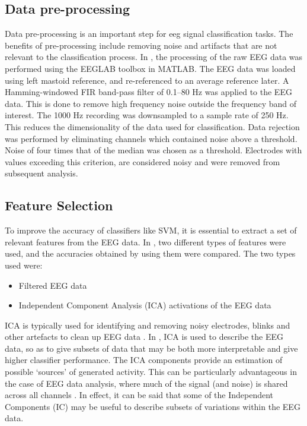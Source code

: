 \documentclass{article} %
\begin{document}
\subsection{Data pre-processing}
Data pre-processing is an important step for eeg signal classification tasks. The benefits of pre-processing include removing noise and artifacts that are not relevant to the classification process. In \cite{Stewart20141}, the processing of the raw EEG data was performed using the EEGLAB toolbox \cite{eeglab} in MATLAB. The EEG data was loaded using left mastoid reference, and re-referenced to an average reference later. A Hamming-windowed FIR band-pass filter of 0.1–80 Hz was applied to the EEG data. This is done to remove high frequency noise outside the frequency band of interest. The 1000 Hz recording was downsampled to a sample rate of 250 Hz. This reduces the dimensionality of the data used for classification.
Data rejection was performed by eliminating channels which contained noise above a threshold. Noise of four times that of the median was chosen as a threshold. Electrodes with values exceeding this criterion, are considered noisy and were removed from subsequent analysis.

\subsection{Feature Selection}
To improve the accuracy of classifiers like SVM, it is essential to extract a set of relevant features from the EEG data. In \cite{Stewart20141}, two different types of features were used, and the accuracies obtained by using them were compared. The two types used were:

\begin{itemize}
	\item Filtered EEG data
	\item Independent Component Analysis (ICA) activations of the EEG data
\end{itemize}

ICA is typically used for identifying and removing noisy electrodes, blinks and other artefacts to clean up EEG data \cite{luck2005}. In \cite{Stewart20141}, ICA is used to describe the EEG data, so as to give subsets of data that may be both more interpretable and give higher classifier performance. The ICA components provide an estimation of possible ‘sources’ of generated activity. This can be particularly advantageous in the case of EEG data analysis, where much of the signal (and noise) is shared across all channels \cite{Onton2006808}. In effect, it can be said that some of the Independent Components (IC) may be useful to describe subsets of variations within the EEG data. 
\end{document}

